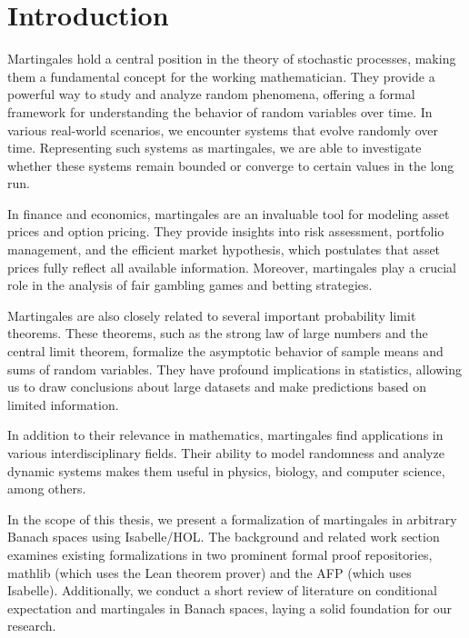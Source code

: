 ﻿%

\chapter{Introduction}\label{chapter:introduction}

Martingales hold a central position in the theory of stochastic processes, making them a fundamental concept for the working mathematician. They provide a powerful way to study and analyze random phenomena, offering a formal framework for understanding the behavior of random variables over time. In various real-world scenarios, we encounter systems that evolve randomly over time. Representing such systems as martingales, we are able to investigate whether these systems remain bounded or converge to certain values in the long run.

In finance and economics, martingales are an invaluable tool for modeling asset prices and option pricing. They provide insights into risk assessment, portfolio management, and the efficient market hypothesis, which postulates that asset prices fully reflect all available information. Moreover, martingales play a crucial role in the analysis of fair gambling games and betting strategies. 

Martingales are also closely related to several important probability limit theorems. These theorems, such as the strong law of large numbers and the central limit theorem, formalize the asymptotic behavior of sample means and sums of random variables. They have profound implications in statistics, allowing us to draw conclusions about large datasets and make predictions based on limited information.

In addition to their relevance in mathematics, martingales find applications in various interdisciplinary fields. Their ability to model randomness and analyze dynamic systems makes them useful in physics, biology, and computer science, among others.

In the scope of this thesis, we present a formalization of martingales in arbitrary Banach spaces using Isabelle/HOL. The background and related work section examines existing formalizations in two prominent formal proof repositories, \textsf{mathlib} (which uses the Lean theorem prover) and the \textsf{\ac{AFP}} (which uses Isabelle). Additionally, we conduct a short review of literature on conditional expectation and martingales in Banach spaces, laying a solid foundation for our research.

